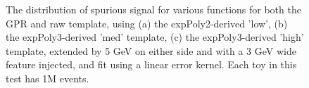 \begin{figure} 
\begin{center}

\caption{The distribution of spurious signal for various functions for both the GPR and raw template, using (a) the expPoly2-derived 'low', (b) the expPoly3-derived 'med' template, (c) the expPoly3-derived 'high' template, extended by 5 GeV on either side and with a 3 GeV wide feature injected, and fit using a linear error kernel. Each toy in this test has 1M events.}
\label{fig:linearkernel_lowpt_1M_Sig_1s}
\end{center}
\end{figure}

